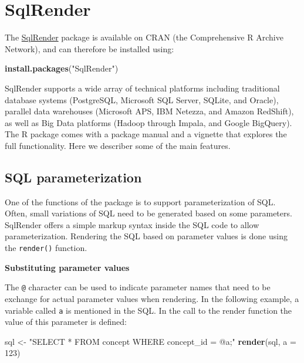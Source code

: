\documentclass[11pt]{book}
\newenvironment{Shaded}{\begin{snugshade}}{\end{snugshade}}
\newcommand{\DataTypeTok}[1]{\textcolor[rgb]{0.13,0.29,0.53}{#1}}
\newcommand{\DecValTok}[1]{\textcolor[rgb]{0.00,0.00,0.81}{#1}}
\newcommand{\KeywordTok}[1]{\textcolor[rgb]{0.13,0.29,0.53}{\textbf{#1}}}
\newcommand{\NormalTok}[1]{#1}
\newcommand{\StringTok}[1]{\textcolor[rgb]{0.31,0.60,0.02}{#1}}
\theoremstyle{definition}
\theoremstyle{definition}
\theoremstyle{definition}
\theoremstyle{remark}
\begin{document}
\hypertarget{SqlRender}{%
\section{SqlRender}\label{SqlRender}}

The \href{https://ohdsi.github.io/SqlRender/}{SqlRender} package is available on CRAN (the Comprehensive R Archive Network), and can therefore be installed using:

\begin{Shaded}
\begin{Highlighting}[]
\KeywordTok{install.packages}\NormalTok{(}\StringTok{"SqlRender"}\NormalTok{)}
\end{Highlighting}
\end{Shaded}

SqlRender supports a wide array of technical platforms including traditional database systems (PostgreSQL, Microsoft SQL Server, SQLite, and Oracle), parallel data warehouses (Microsoft APS, IBM Netezza, and Amazon RedShift), as well as Big Data platforms (Hadoop through Impala, and Google BigQuery). The R package comes with a package manual and a vignette that explores the full functionality. Here we describer some of the main features.

\hypertarget{sql-parameterization}{%
\subsection{SQL parameterization}\label{sql-parameterization}}

One of the functions of the package is to support parameterization of SQL. Often, small variations of SQL need to be generated based on some parameters. SqlRender offers a simple markup syntax inside the SQL code to allow parameterization. Rendering the SQL based on parameter values is done using the \texttt{render()} function.

\textbf{Substituting parameter values}

The \texttt{@} character can be used to indicate parameter names that need to be exchange for actual parameter values when rendering. In the following example, a variable called \texttt{a} is mentioned in the SQL. In the call to the render function the value of this parameter is defined:

\begin{Shaded}
\begin{Highlighting}[]
\NormalTok{sql <-}\StringTok{ "SELECT * FROM concept WHERE concept_id = @a;"}
\KeywordTok{render}\NormalTok{(sql, }\DataTypeTok{a =} \DecValTok{123}\NormalTok{)}
\end{Highlighting}
\end{Shaded}
\end{document}
